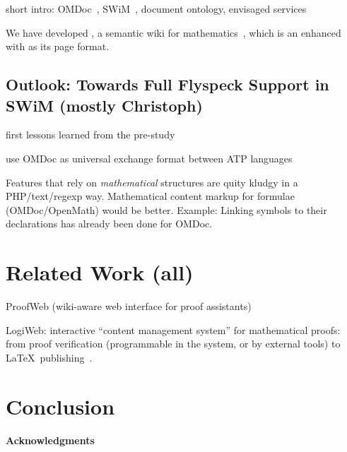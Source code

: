 \documentclass{llncs}
\begin{document}
short intro: OMDoc~\cite{Kohlhase:omdoc1.2}, SWiM~\cite{Lange:swmkm-tr07}, document
ontology, envisaged services

We have developed {\swim}, a semantic wiki for mathematics~\cite{Lange:swmkm-tr07}, which
is an enhanced ~\cite{KrSchVr:semwiki-reasoning07} with {\omdoc} as its
page format.

\subsection{Outlook: Towards Full Flyspeck Support in SWiM (mostly Christoph)}
\label{sec:flyspeck-swim}

first lessons learned from the pre-study

use OMDoc as universal exchange format between ATP languages

Features that rely on \emph{mathematical} structures are quity kludgy in a PHP/text/regexp
way.  Mathematical content markup for formulae (OMDoc/OpenMath) would be better.  Example:
Linking symbols to their declarations has already been done for OMDoc.


\section{Related Work (all)}
\label{sec:related}


ProofWeb (wiki-aware web interface for proof
assistants)~\cite{CorKal:CoopReposFormalProofs07}

LogiWeb: interactive ``content management system'' for mathematical proofs: from proof
verification (programmable in the system, or by external tools) to \LaTeX\
publishing~\cite{Grue:Logiweb07}.

\section{Conclusion}
\label{sec:conc}


\paragraph{Acknowledgments}
\label{sec:ack}





\ednotemessage
\end{document}
